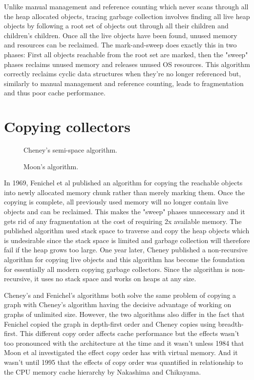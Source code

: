 \documentclass[a4paper,oneside]{memoir}
\begin{document}
Unlike manual management and reference counting which never scans through all
the heap allocated objects, tracing garbage collection involves finding all live
heap objects by following a root set of objects out through all their children
and children's children. Once all the live objects have been found, unused memory
and resources can be reclaimed.
The mark-and-sweep does exactly this in two phases: First all objects reachable
from the root set are marked, then the "sweep" phases reclaims unused memory and
releases unused OS resources.
This algorithm correctly reclaims cyclic data structures when they're no longer
referenced but, similarly to manual management and reference counting, leads to
fragmentation and thus poor cache performance.

\section{Copying collectors}
\begin{figure}
  \centering
  
  \caption{Cheney's semi-space algorithm.}
\end{figure}
\begin{figure}[b]
  \centering
  
  \caption{Moon's algorithm.}
\end{figure}

In 1969, Fenichel et al published an algorithm for copying the reachable objects
into newly allocated memory chunk rather than merely marking them.\cite{Fenichel} Once the copying
is complete, all previously used memory will no longer contain live objects
and can be reclaimed. This makes the "sweep" phases unnecessary and it gets rid
of any fragmentation at the cost of requiring 2x available memory. The published
algorithm used stack space to traverse and copy the heap objects which is
undesirable since the stack space is limited and garbage collection will therefore
fail if the heap grows too large. One year later, Cheney published a non-recursive
algorithm for copying live objects and this algorithm has become the foundation
for essentially all modern copying garbage collectors. Since the algorithm is
non-recursive, it uses no stack space and works on heaps at any size.

Cheney's and Fenichel's algorithms both solve the same problem of copying a graph
with Cheney's algorithm having the decisive advantage of working on graphs of
unlimited size. However, the two algorithms also differ in the fact that Fenichel
copied the graph in depth-first order and Cheney copies using breadth-first. This
different copy order affects cache performance but the effects wasn't too pronounced
with the architecture at the time and it wasn't unless 1984 that Moon et al
investigated the effect copy order has with virtual memory. And it wasn't until
1995 that the effects of copy order was quantified in relationship to the
CPU memory cache hierarchy by Nakashima and Chikayama.
\end{document}

